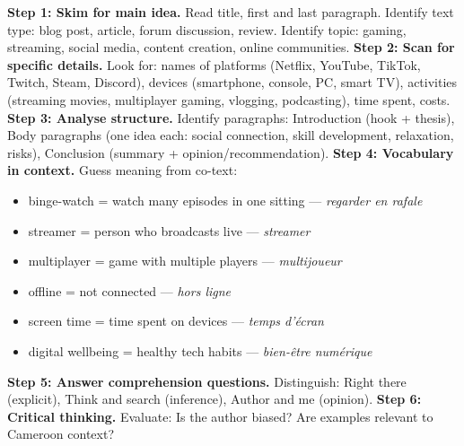 \documentclass[11pt]{article}
\newcommand{\cle}[1]{{\popxbold\color{popdark}#1}}
\begin{document}
\begin{methode}
\textbf{Step 1: Skim for main idea.} Read title, first and last paragraph. Identify text type: blog post, article, forum discussion, review. Identify topic: gaming, streaming, social media, content creation, online communities.
\textbf{Step 2: Scan for specific details.} Look for: names of platforms (Netflix, YouTube, TikTok, Twitch, Steam, Discord), devices (smartphone, console, PC, smart TV), activities (streaming movies, multiplayer gaming, vlogging, podcasting), time spent, costs.
\textbf{Step 3: Analyse structure.} Identify paragraphs: Introduction (hook + thesis), Body paragraphs (one idea each: social connection, skill development, relaxation, risks), Conclusion (summary + opinion/recommendation).
\textbf{Step 4: Vocabulary in context.} Guess meaning from co-text:
\begin{itemize}
    \item \cle{binge-watch} = watch many episodes in one sitting — \emph{regarder en rafale}
    \item \cle{streamer} = person who broadcasts live — \emph{streamer}
    \item \cle{multiplayer} = game with multiple players — \emph{multijoueur}
    \item \cle{offline} = not connected — \emph{hors ligne}
    \item \cle{screen time} = time spent on devices — \emph{temps d'écran}
    \item \cle{digital wellbeing} = healthy tech habits — \emph{bien-être numérique}
\end{itemize}
\textbf{Step 5: Answer comprehension questions.} Distinguish: \cle{Right there} (explicit), \cle{Think and search} (inference), \cle{Author and me} (opinion).
\textbf{Step 6: Critical thinking.} Evaluate: Is the author biased? Are examples relevant to Cameroon context?
\end{methode}
\end{document}
